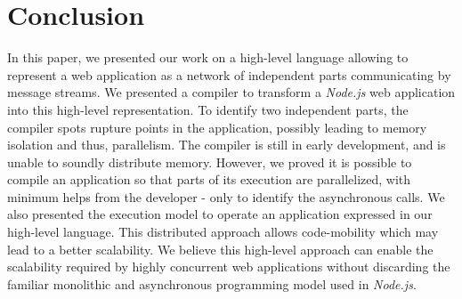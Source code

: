 \section{Conclusion} \label{section:conclusion}


In this paper, we presented our work on a high-level language allowing to represent a web application as a network of independent parts communicating by message streams.
We presented a compiler to transform a \textit{Node.js} web application into this high-level representation.
To identify two independent parts, the compiler spots rupture points in the application, possibly leading to memory isolation and thus, parallelism.
The compiler is still in early development, and is unable to soundly distribute memory.
However, we proved it is possible to compile an application so that parts of its execution are parallelized, with minimum helps from the developer - only to identify the asynchronous calls.
We also presented the execution model to operate an application expressed in our high-level language.
This distributed approach allows code-mobility which may lead to a better scalability.
We believe this high-level approach can enable the scalability required by highly concurrent web applications without discarding the familiar monolithic and asynchronous programming model used in \textit{Node.js}.


\endinput

Many frameworks for distributed systems focus mainly on the performances\cite{Akidau2013, Jain2006, Marz2011, Welsh2000, Wu2007, Zaharia2010}.
However, we focus on a compilation approach to replace the shift in programming model rather than the performance of the runtime.
We present in this section an extremely simplified but generic execution model inspired by the literature, only to support the confirmation of feasibility for the compilation process detailed in section \ref{section:compiler}.
The execution model is not distributed on remote machines, however it can isolate the execution of fluxions in different processes to reproduce the conditions of a distributed execution model.
We are interested in the problems arising from this isolation.

